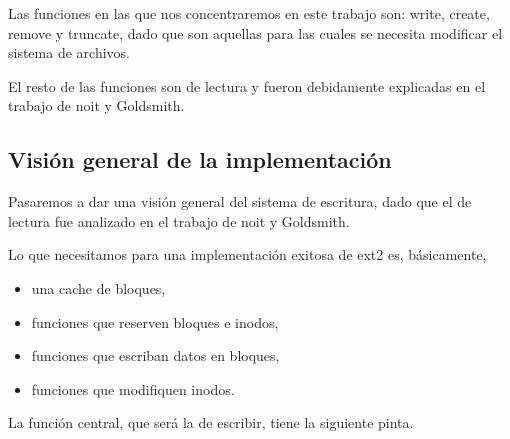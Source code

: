 Las funciones en las que nos concentraremos en este trabajo son: write, create, remove y truncate, dado que son aquellas para las cuales se necesita modificar el sistema de archivos.

El resto de las funciones son de lectura y fueron debidamente explicadas en el trabajo de noit y Goldsmith.


\subsection{Visión general de la implementación}

Pasaremos a dar una visión general del sistema de escritura, dado que el de lectura fue analizado en el trabajo de noit y Goldsmith.

Lo que necesitamos para una implementación exitosa de ext2 es, básicamente,

\begin{itemize}
  \item una cache de bloques,
  \item funciones que reserven bloques e inodos,
  \item funciones que escriban datos en bloques,
  \item funciones que modifiquen inodos.
\end{itemize}

La función central, que será la de escribir, tiene la siguiente pinta.


